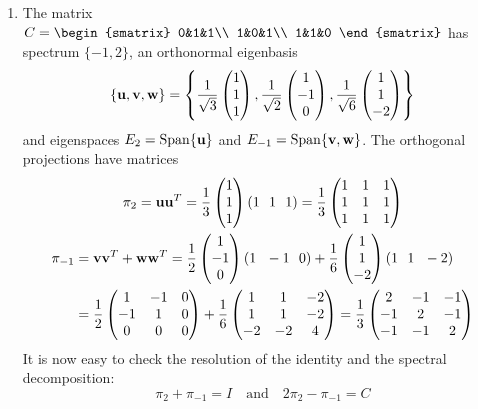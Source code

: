 \begin{examples}{}{}
\begin{enumerate}
		\item The matrix $C=
		\begin{smatrix}
			0&1&1\\
			1&0&1\\
			1&1&0
		\end{smatrix}$ 
		has spectrum $\{-1,2\}$, an orthonormal eigenbasis
		\[
			\{{\mathbf{u}},{\mathbf{v}},{\mathbf{w}}\} 
			=\left\{\frac 1{\sqrt 3}\begin{pmatrix}1\\1\\1\end{pmatrix}, \frac 1{\sqrt 2}\begin{pmatrix}1\\-1\\0\end{pmatrix},\frac 1{\sqrt 6}\begin{pmatrix}1\\1\\-2\end{pmatrix} \right\}
		\]
		and eigenspaces $E_2=\operatorname{Span}\{{\mathbf{u}}\}$ and $E_{-1}=\operatorname{Span}\{{\mathbf{v}},{\mathbf{w}}\}$. The orthogonal projections have matrices
		\begin{gather*}
			\pi_2={\mathbf{u}}{\mathbf{u}}^T=\frac 13\begin{pmatrix}1\\1\\1\end{pmatrix}(1\ \ 1\ \ 1)
			=\frac 13
			\begin{pmatrix}
				1&1&1\\
				1&1&1\\
				1&1&1
			\end{pmatrix}
			\\
			\begin{aligned}
				\pi_{-1}&={\mathbf{v}}{\mathbf{v}}^T+{\mathbf{w}}{\mathbf{w}}^T
				=\frac 12\begin{pmatrix}1\\-1\\0\end{pmatrix}(1\ \ -1\ \ 0)
				+\frac 16\begin{pmatrix}1\\1\\-2\end{pmatrix}(1\ \ 1\ \ -2)\\
				&=\frac 12
				\begin{pmatrix}
					1&-1&0\\
					-1&1&0\\
					0&0&0
				\end{pmatrix}
				+\frac 16
				\begin{pmatrix}
					1&1&-2\\
					1&1&-2\\
					-2&-2&4
				\end{pmatrix}
				=\frac 13
				\begin{pmatrix}
					2&-1&-1\\
					-1&2&-1\\
					-1&-1&2
				\end{pmatrix}
			\end{aligned}
		\end{gather*}
		It is now easy to check the resolution of the identity and the spectral decomposition:
		\[
			\pi_2+\pi_{-1}=I
			\quad\text{and}\quad 
			2\pi_2-\pi_{-1}=C
		\]
	\end{enumerate}
\end{examples}


\pagebreak[3]


\label{sec:leastsq}


